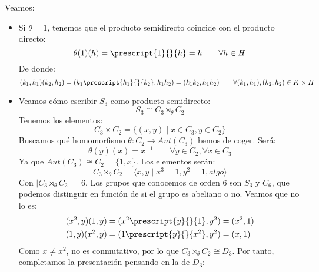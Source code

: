 \begin{ejemplo}
    Veamos:
    \begin{itemize}
        \item Si $\theta = 1$, tenemos que el producto semidirecto coincide con el producto directo:
            \begin{equation*}
                \theta(1)(h) = \prescript{1}{}{h} = h\qquad \forall h\in H
            \end{equation*}
            De donde:
            \begin{equation*}
                (k_1,h_1)(k_2,h_2) = (k_1\prescript{h_1}{}{k_2}, h_1h_2) = (k_1k_2,h_1h_2) \qquad \forall (k_1,h_1),(k_2,h_2)\in K\times H
            \end{equation*}
        \item Veamos cómo escribir $S_3$ como producto semidirecto:
            \begin{equation*}
                S_3 \cong C_3 \rtimes_{\theta} C_2
            \end{equation*}
            Tenemos los elementos:
            \begin{equation*}
                C_3\times C_2 = \{(x,y) \mid x\in C_3, y\in C_2\}
            \end{equation*}
            Buscamos qué homomorfismo $\theta:C_2\to Aut(C_3)$ hemos de coger. Será:
            \begin{equation*}
                \theta(y)(x) = x^{-1} \qquad \forall y\in C_2, \forall x\in C_3
            \end{equation*}
            Ya que $Aut(C_3)\cong C_2 = \{1,x\}$. Los elementos serán:
            \begin{equation*}
                C_3 \rtimes_\theta C_2 = \langle x,y\mid x^3=1, y^2 = 1, algo \rangle 
            \end{equation*}
            Con $|C_3\rtimes_\theta C_2| = 6$. Los grupos que conocemos de orden 6 son $S_3$ y $C_6$, que podemos distinguir en función de si el grupo es abeliano o no. Veamos que no lo es:
            \begin{align*}
                (x^2,y)(1,y) &= (x^2 \prescript{y}{}{1}, y^2) = (x^2,1) \\
                (1,y)(x^2,y) &= (1\prescript{y}{}{x^2}, y^2) = (x, 1)
            \end{align*}
            Como $x\neq x^2$, no es conmutativo, por lo que $C_3\rtimes_\theta C_2\cong D_3$. Por tanto, completamos la presentación pensando en la de $D_3$:
            \begin{equation*}

\end{equation*}
\end{itemize}
\end{ejemplo}
